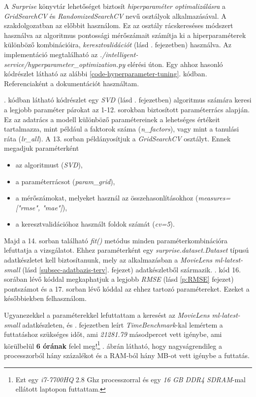 \documentclass[
]{thesis-ekf}
\theoremstyle{definition}
\theoremstyle{remark}
\newcommand{\benchmarkSpecification} {Ezt egy \emph{i7-7700HQ} 2.8 Ghz processzorral és egy \emph{16 GB DDR4 SDRAM}-mal ellátott laptopon futtattam.}
\begin{document}
A \emph{Surprise} könyvtár lehetőséget biztosít \emph{hiperparaméter optimalizálásra} a \emph{GridSearchCV} és \emph{RandomizedSearchCV} nevű osztályok alkalmazásával. A szakdolgozatban az előbbit használom. Ez az osztály rácskereséses módszert használva az algoritmus pontossági mérőszámait számítja ki a hiperparaméterek különböző kombinációira, \emph{keresztvalidációt} (lásd . fejezetben) használva. Az implementáció megtalálható az \emph{./intelligent-service/hyperparameter\_optimization.py} elérési úton. Egy ahhoz hasonló kódrészlet látható az alábbi \ref{code-hyperparameter-tuning}. kódban. Referenciaként a dokumentációt használtam.\cite{surpriselib_docs:tune-algorithms-w-gridsearch}



. kódban látható kódrészlet egy \emph{SVD} (lásd . fejezetben) algoritmus számára keresi a legjobb paraméter párokat az 1-12. sorokban biztosított paraméterrács alapján. Ez az adatrács a modell különböző paramétereinek a lehetséges értékeit tartalmazza, mint például a faktorok száma (\emph{n\_factors}), vagy mint a tanulási ráta (\emph{lr\_all}). A 13. sorban példányosítjuk a \emph{GridSearchCV} osztályt. Ennek megadjuk paraméterként 
\begin{itemize}
	\item az algoritmust (\emph{SVD}),
	\item a paraméterrácsot (\emph{param\_grid}),
	\item a mérőszámokat, melyeket használ az összehasonlításokhoz (\emph{measures=["rmse", "mae"]}),
	\item a keresztvalidációhoz használt foldok számát (\emph{cv=5}).
\end{itemize}
Majd a 14. sorban található \emph{fit()} metódus minden paraméterkombinációra lefuttatja a vizsgálatot. Ehhez paraméterként egy \emph{surprise.dataset.Dataset} típusú adatkészletet kell biztosítanunk, mely az alkalmazásban a \emph{MovieLens ml-latest-small} (lásd \ref{subsec-adatbazis-terv}. fejezet) adatkészletből származik. . kód 16. sorában lévő kóddal megkaphatjuk a legjobb \emph{RMSE} (lásd \ref{p:RMSE} fejezet) pontszámot és a 17. sorban lévő kóddal az ehhez tartozó paramétereket. Ezeket a későbbiekben felhasználom.

Ugyanezekkel a paraméterekkel lefuttattam a keresést az \emph{MovieLens ml-latest-small} adatkészleten, és . fejezetben leírt \emph{TimeBenchmark}-kal lemértem a futtatáshoz szükséges időt, ami \emph{21281.79} másodpercet vett igénybe, ami körülbelül \textbf{6 órának} felel meg!\footnote{\benchmarkSpecification{}} . ábrán látható, hogy nagyságrendileg a processzorból hány százalékot és a RAM-ból hány MB-ot vett igénybe a futtatás.
\end{document}
